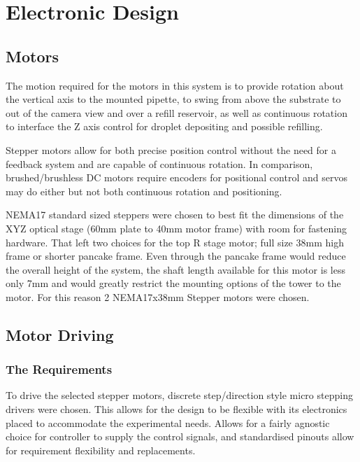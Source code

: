 \section{Electronic Design}

\subsection{Motors}
The motion required for the motors in this system is to provide rotation about the vertical axis to the mounted pipette, to swing from above the substrate to out of the camera view and over a refill reservoir, as well as continuous rotation to interface the Z axis control for droplet depositing and possible refilling.  

Stepper motors allow for both precise position control without the need for a feedback system and are capable of continuous rotation. In comparison, brushed/brushless DC motors require encoders for positional control and servos may do either but not both continuous rotation and positioning.

NEMA17 standard sized steppers were chosen to best fit the dimensions of the XYZ optical stage (60mm plate to 40mm motor frame) with room for fastening hardware. That left two choices for the top R stage motor; full size 38mm high frame or shorter pancake frame. Even through the pancake frame would reduce the overall height of the system, the shaft length available for this motor is less only 7mm and would greatly restrict the mounting options of the tower to the motor. For this reason 2 NEMA17x38mm Stepper motors were chosen. 

\subsection{Motor Driving}

\subsubsection*{The Requirements}
To drive the selected stepper motors, discrete step/direction style micro stepping drivers were chosen. This allows for the design to be flexible with its electronics placed to accommodate the experimental needs. Allows for a fairly agnostic choice for controller to supply the control signals, and standardised pinouts allow for requirement flexibility and replacements.

